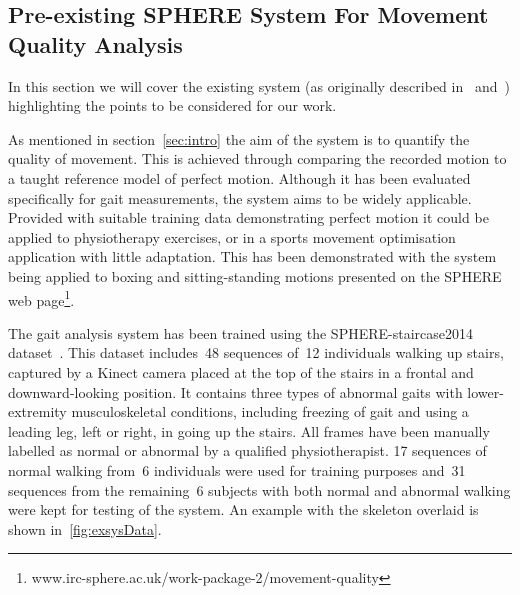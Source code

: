 \documentclass[11pt]{article} %
\begin{document}





















\begin{appendices}

\section{Pre-existing SPHERE System For Movement Quality Analysis}

\label{sec:exSys}

In this section we will cover the existing system (as originally described in~\cite{Paiement} and~\cite{Tao}) highlighting the points to be considered for our work.

As mentioned in section~\ref{sec:intro} the aim of the system is to quantify the quality of movement. This is achieved through comparing the recorded motion to a taught reference model of perfect motion. Although it has been evaluated specifically for gait measurements, the system aims to be widely applicable. Provided with suitable training data demonstrating perfect motion it could be applied to physiotherapy exercises, or in a sports movement optimisation application with little adaptation. This has been demonstrated with the system being applied to boxing and sitting-standing motions presented on the SPHERE web page\footnote{www.irc-sphere.ac.uk/work-package-2/movement-quality}.


The gait analysis system has been trained using the SPHERE-staircase2014 dataset~\cite{Paiement}. This dataset includes~48 sequences of~12 individuals walking up stairs, captured by a Kinect camera placed at the top of the stairs in a frontal and downward-looking position. It contains three types of abnormal gaits with lower-extremity musculoskeletal conditions, including freezing of gait and using a leading leg, left or right, in going up the stairs. All frames have been manually labelled as normal or abnormal by a qualified physiotherapist. 17 sequences of normal walking from~6 individuals were used for training purposes and~31 sequences from the remaining~6 subjects with both normal and abnormal walking were kept for testing of the system. An example with the skeleton overlaid is shown in~\ref{fig:exsysData}.



\end{appendices}
\end{document}
